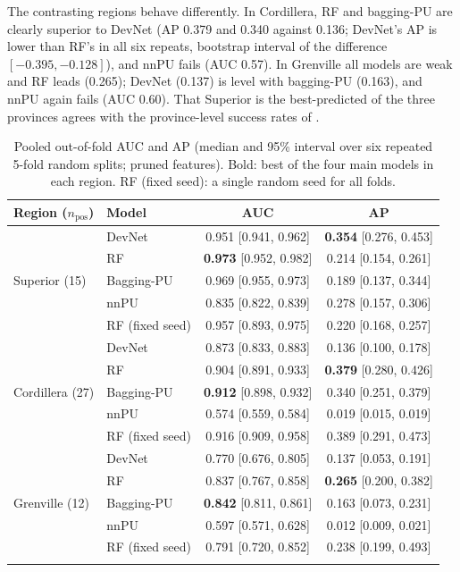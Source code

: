 \documentclass[pdflatex,sn-apa]{sn-jnl}
\begin{document}
The contrasting regions behave differently. In Cordillera, RF and bagging-PU are clearly superior to DevNet (AP 0.379 and 0.340 against 0.136; DevNet's AP is lower than RF's in all six repeats, bootstrap interval of the difference $[-0.395, -0.128]$), and nnPU fails (AUC 0.57). In Grenville all models are weak and RF leads (0.265); DevNet (0.137) is level with bagging-PU (0.163), and nnPU again fails (AUC 0.60). That Superior is the best-predicted of the three provinces agrees with the province-level success rates of \citet{Parsa2024}.

\begin{table}[t]
\caption{Pooled out-of-fold AUC and AP (median and 95\% interval over six repeated 5-fold random splits; pruned features). Bold: best of the four main models in each region. RF (fixed seed): a single random seed for all folds.}\label{tab:benchmark}
\footnotesize
\begin{tabular*}{\textwidth}{@{\extracolsep\fill}llcc}
\toprule
Region ($n_{\mathrm{pos}}$) & Model & AUC & AP \\
\midrule
\multirow{5}{*}{Superior (15)} & DevNet & 0.951 [0.941, 0.962] & \textbf{0.354} [0.276, 0.453] \\
 & RF & \textbf{0.973} [0.952, 0.982] & 0.214 [0.154, 0.261] \\
 & Bagging-PU & 0.969 [0.955, 0.973] & 0.189 [0.137, 0.344] \\
 & nnPU & 0.835 [0.822, 0.839] & 0.278 [0.157, 0.306] \\
 & RF (fixed seed) & 0.957 [0.893, 0.975] & 0.220 [0.168, 0.257] \\
\midrule
\multirow{5}{*}{Cordillera (27)} & DevNet & 0.873 [0.833, 0.883] & 0.136 [0.100, 0.178] \\
 & RF & 0.904 [0.891, 0.933] & \textbf{0.379} [0.280, 0.426] \\
 & Bagging-PU & \textbf{0.912} [0.898, 0.932] & 0.340 [0.251, 0.379] \\
 & nnPU & 0.574 [0.559, 0.584] & 0.019 [0.015, 0.019] \\
 & RF (fixed seed) & 0.916 [0.909, 0.958] & 0.389 [0.291, 0.473] \\
\midrule
\multirow{5}{*}{Grenville (12)} & DevNet & 0.770 [0.676, 0.805] & 0.137 [0.053, 0.191] \\
 & RF & 0.837 [0.767, 0.858] & \textbf{0.265} [0.200, 0.382] \\
 & Bagging-PU & \textbf{0.842} [0.811, 0.861] & 0.163 [0.073, 0.231] \\
 & nnPU & 0.597 [0.571, 0.628] & 0.012 [0.009, 0.021] \\
 & RF (fixed seed) & 0.791 [0.720, 0.852] & 0.238 [0.199, 0.493] \\
\botrule
\end{tabular*}
\end{table}
\end{document}
